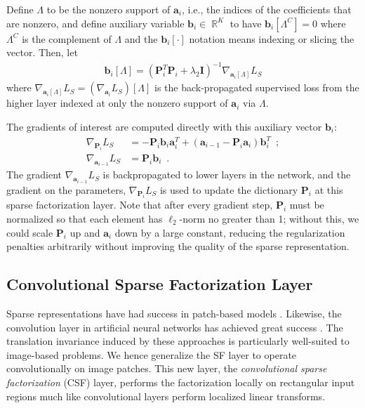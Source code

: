 \documentclass[10pt,twocolumn,letterpaper]{article}
\newcommand{\reals}{\mathop \mathbb{R}}
\renewcommand{\vec}{\mathbf}
\newcommand{\grad}[2]{\nabla_{\!\! #1} #2}
\renewcommand{\P}{\vec{P}}
\renewcommand{\a}{\vec{a}}
\renewcommand{\b}{\vec{b}}
\begin{document}
Define $\Lambda$ to be the nonzero support of $\a_i$, i.e., the indices of the coefficients that are nonzero, and define auxiliary variable $\b_i \in \reals^K$ to have $\b_i[\Lambda^C] = 0$ where $\Lambda^C$ is the complement of $\Lambda$ and the $\b_i[\cdot]$ notation means indexing or slicing the vector. Then, let
\begin{align}
    \b_i[\Lambda] = (\P_i^{T}\P_i+\lambda_2\mathbf{I})^{-1} \grad{\a_{i}[\Lambda]}{L_S}
    \label{eq:b}
\end{align}
where $\grad{\a_{i}[\Lambda]}{L_S} = (\grad{\a_{i}}{L_S})[\Lambda]$ is the back-propagated supervised loss from the higher layer indexed at only the nonzero support of $\a_i$ via $\Lambda$.

The gradients of interest are computed directly with this auxiliary vector $\b_i$:
\begin{align}
    \grad{\P_i}{L_S} &= -\P_i\b_i\a_i^{T} + (\a_{i-1}-\P_i\a_i)\b_i^{T}
    \enspace;
    \label{eq:sfgradpi}
    \\
    \grad{\a_{i-1}}{L_S} &= \P_i\b_i
    \enspace.
    \label{eq:sfgradaminus1}
\end{align}
The gradient $\grad{\a_{i-1}}{L_S}$ is backpropagated to lower layers in the network, and the gradient on the parameters, $\grad{\P_i}{L_S}$ is used to update the dictionary $\P_i$ at this sparse factorization layer. Note that after every gradient step, $\P_i$ must be normalized so that each element has $\ell_2$-norm no greater than 1; without this, we could scale $\P_i$ up and $\a_i$ down by a large constant, reducing the regularization penalties arbitrarily without improving the quality of the sparse representation. 









\subsection{Convolutional Sparse Factorization Layer}
\label{sec:csflayer}

Sparse representations have had success in patch-based models \cite{mairal2008sparse}.  
Likewise, the convolution layer in artificial neural networks has achieved 
great success \cite{HeZhReCVPR2016,SiZiICLR2015,KrSuHiNIPS2012}.  The translation invariance induced by these approaches 
is particularly well-suited to image-based problems.  We hence generalize the 
SF layer to operate convolutionally on image patches.  This new layer, the 
\textit{convolutional sparse factorization} (CSF) layer, performs the 
factorization locally on rectangular input regions much like convolutional 
layers perform localized linear transforms.
\end{document}
